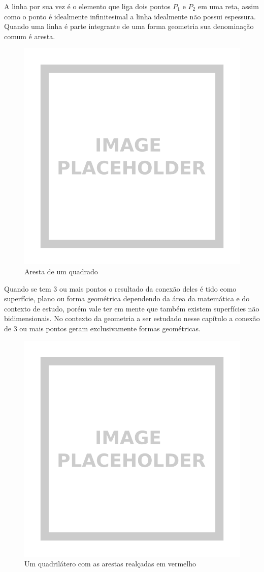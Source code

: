 \begin{multicols*}{2}
    A linha por sua vez é o elemento que liga dois pontos $P_1$ e $P_2$ em uma reta, assim como o ponto é idealmente 
    infinitesimal a linha idealmente não possui espessura. Quando uma linha é parte integrante de uma forma geometria 
    sua denominação comum é aresta.

    \begin{figure}[H]
        \centering
        \includegraphics[width=0.7\columnwidth]{assets/image_placeholder.png}
        \caption{Aresta de um quadrado}
    \end{figure}


    Quando se tem 3 ou mais pontos o resultado da conexão deles é tido como superfície, plano ou forma geométrica 
    dependendo da área da matemática e do contexto de estudo, porém vale ter em mente que também existem superfícies 
    não bidimensionais. No contexto da geometria a ser estudado nesse capítulo a conexão de 3 ou mais pontos 
    geram exclusivamente formas geométricas.

    \begin{figure}[H]
        \centering
        \includegraphics[width=0.7\columnwidth]{assets/image_placeholder.png}
        \caption{Um quadrilátero com as arestas realçadas em vermelho}
    \end{figure}





\end{multicols*}
